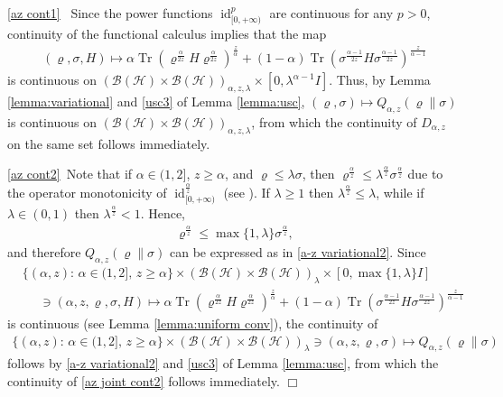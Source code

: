 \documentclass[unsortedaddress,superscriptaddress,pra,notitlepage]{revtex4}
\newenvironment{proof}[1][Proof]{\begin{trivlist}
\item[\hskip \labelsep {\bfseries #1}]}{\hfill$\Box$\end{trivlist}}
\def\B{{\mathcal B}}
\def\rho{\varrho}
\def\hil{{\mathcal H}}
\def\bz{\left(}
\def\jz{\right)}
\newcommand{\s}{\mbox{ }}
\newcommand{\ds}{\mbox{ }\mbox{ }}
\DeclareMathOperator{\id}{id}
\DeclareMathOperator{\Tr}{Tr}
\begin{document}
\begin{proof}
\ref{az cont1}\s
Since the power functions $\id_{[0,+\infty)}^p$ 
are continuous for any $p>0$, continuity of the functional calculus implies that the map
\begin{align*}
(\rho,\sigma,H)\mapsto
\alpha\Tr \bz \rho^{\frac{\alpha}{2z}} H\rho^{\frac{\alpha}{2z}} \jz^{\frac{z}{\alpha}}
+(1-\alpha)\Tr\bz \sigma^{\frac{\alpha-1}{2z}}H\sigma^{\frac{\alpha-1}{2z}}\jz^{\frac{z}{\alpha-1}}
\end{align*}
is continuous on $\bz\B(\hil)\times\B(\hil)\jz_{\alpha,z,\lambda}\times [0,\lambda^{\alpha-1}I]$.
Thus, by Lemma \ref{lemma:variational} and \ref{usc3} of Lemma \ref{lemma:usc},
$(\rho,\sigma)\mapsto Q_{\alpha,z}(\rho\|\sigma)$ is continuous on 
$\bz\B(\hil)\times\B(\hil)\jz_{\alpha,z,\lambda}$, from which the 
continuity of $D_{\alpha,z}$ on the same set follows immediately.

\ref{az cont2}\s Note that if $\alpha\in(1,2]$, $z\ge \alpha$, 
and $\rho\le\lambda\sigma$, then 
$\rho^{\frac{\alpha}{z}}\le\lambda^{\frac{\alpha}{z}}\sigma^{\frac{\alpha}{z}}$
due to the operator monotonicity of 
$\id_{[0,+\infty)}^{\frac{\alpha}{z}}$ (see \cite{Bhatia}). 
If $\lambda\ge 1$ then $\lambda^{\frac{\alpha}{z}}\le \lambda$, 
while if $\lambda\in(0,1)$ then $\lambda^{\frac{\alpha}{z}}< 1$.
Hence,
\begin{align*}
\rho^{\frac{\alpha}{z}}
\le\max\{1,\lambda\}\sigma^{\frac{\alpha}{z}},
\end{align*}
and therefore $Q_{\alpha,z}(\rho\|\sigma)$ can be expressed as in 
\eqref{a-z variational2}.
Since
\begin{align*}
&\{(\alpha,z):\,\alpha\in(1,2],\,z\ge \alpha\}\times(\B(\hil)\times\B(\hil))_{\lambda}\times
\left[0,\max\{1,\lambda\} I\right]\\
&\ds\ni(\alpha,z,\rho,\sigma,H)\mapsto
\alpha\Tr \bz \rho^{\frac{\alpha}{2z}} H\rho^{\frac{\alpha}{2z}} \jz^{\frac{z}{\alpha}}
+(1-\alpha)\Tr\bz \sigma^{\frac{\alpha-1}{2z}}H\sigma^{\frac{\alpha-1}{2z}}\jz^{\frac{z}{\alpha-1}}
\end{align*}
is continuous (see Lemma \ref{lemma:uniform conv}), the continuity of 
\begin{align}%
\{(\alpha,z):\,\alpha\in(1,2],\,z\ge \alpha\}\times(\B(\hil)\times\B(\hil))_{\lambda}
\ni(\alpha,z,\rho,\sigma)\mapsto Q_{\alpha,z}(\rho\|\sigma)
\end{align}
follows by 
\eqref{a-z variational2} and \ref{usc3} of Lemma \ref{lemma:usc},
from which the continuity of \eqref{az joint cont2} follows immediately.
\end{proof}
\end{document}
